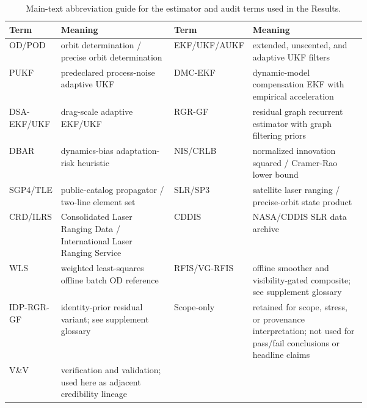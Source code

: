 \begin{table}[t]
  \centering\scriptsize
  \caption{Main-text abbreviation guide for the estimator and audit terms used in the Results.}
  \label{tab:main_abbreviation_glossary}
  \begingroup\setlength{\tabcolsep}{4pt}
  \begin{tabular}{@{}lp{0.34\linewidth}lp{0.34\linewidth}@{}}
    \toprule
    Term & Meaning & Term & Meaning \\
    \midrule
    OD/POD & orbit determination / precise orbit determination & EKF/UKF/AUKF & extended, unscented, and adaptive UKF filters \\
    PUKF & predeclared process-noise adaptive UKF & DMC-EKF & dynamic-model compensation EKF with empirical acceleration \\
    DSA-EKF/UKF & drag-scale adaptive EKF/UKF & RGR-GF & residual graph recurrent estimator with graph filtering priors \\
    DBAR & dynamics-bias adaptation-risk heuristic & NIS/CRLB & normalized innovation squared / Cramer-Rao lower bound \\
    SGP4/TLE & public-catalog propagator / two-line element set & SLR/SP3 & satellite laser ranging / precise-orbit state product \\
    CRD/ILRS & Consolidated Laser Ranging Data / International Laser Ranging Service & CDDIS & NASA/CDDIS SLR data archive \\
    WLS & weighted least-squares offline batch OD reference & RFIS/VG-RFIS & offline smoother and visibility-gated composite; see supplement glossary \\
    IDP-RGR-GF & identity-prior residual variant; see supplement glossary & Scope-only & retained for scope, stress, or provenance interpretation; not used for pass/fail conclusions or headline claims \\
    V\&V & verification and validation; used here as adjacent credibility lineage &  &  \\
    \bottomrule
  \end{tabular}
  \endgroup
\end{table}
